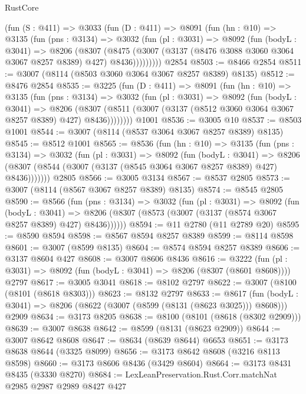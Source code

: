 \begin{lexlean}{RustCore}
\begin{coremodule}
    (fun (S : @411) =>
    @3033
      (fun (D : @411) =>
      @8091
        (fun (hn : @10) =>
        @3135
          (fun (pns : @3134) =>
          @3032
            (fun (pl : @3031) =>
            @8092
              (fun (bodyL : @3041) =>
              @8206
                (@8307
                  (@8475
                    (@3007 (@3137 (@8476 @3088 @3060 @3064 @3067 @8257 @8389) @427) @8436)))))))))
    @2854
@8503 := @8466 @2854
@8511 := @3007 (@8114 (@8503 @3060 @3064 @3067 @8257 @8389) @8135)
@8512 := @8476 @2854
@8535 := @3225
    (fun (D : @411) =>
    @8091
      (fun (hn : @10) =>
      @3135
        (fun (pns : @3134) =>
        @3032
          (fun (pl : @3031) =>
          @8092
            (fun (bodyL : @3041) =>
            @8206
              (@8307 (@8511 (@3007 (@3137 (@8512 @3060 @3064 @3067 @8257 @8389) @427) @8436))))))))
    @1001
@8536 := @3005 @10
@8537 := @8503 @1001
@8544 := @3007 (@8114 (@8537 @3064 @3067 @8257 @8389) @8135)
@8545 := @8512 @1001
@8565 := @8536
    (fun (hn : @10) =>
    @3135
      (fun (pns : @3134) =>
      @3032
        (fun (pl : @3031) =>
        @8092
          (fun (bodyL : @3041) =>
          @8206 (@8307 (@8544 (@3007 (@3137 (@8545 @3064 @3067 @8257 @8389) @427) @8436)))))))
    @2805
@8566 := @3005 @3134
@8567 := @8537 @2805
@8573 := @3007 (@8114 (@8567 @3067 @8257 @8389) @8135)
@8574 := @8545 @2805
@8590 := @8566
    (fun (pns : @3134) =>
    @3032
      (fun (pl : @3031) =>
      @8092
        (fun (bodyL : @3041) =>
        @8206 (@8307 (@8573 (@3007 (@3137 (@8574 @3067 @8257 @8389) @427) @8436))))))
@8594 := @11 @2780 (@11 @2789 @20)
@8595 := @8590 @8594
@8598 := @8567 @8594 @8257 @8389
@8599 := @8114 @8598
@8601 := @3007 (@8599 @8135)
@8604 := @8574 @8594 @8257 @8389
@8606 := @3137 @8604 @427
@8608 := @3007 @8606 @8436
@8616 := @3222
    (fun (pl : @3031) => @8092 (fun (bodyL : @3041) => @8206 (@8307 (@8601 @8608))))
    @2797
@8617 := @3005 @3041
@8618 := @8102 @2797
@8622 := @3007 (@8100 (@8101 (@8618 @8303)))
@8623 := @8132 @2797
@8633 := @8617
    (fun (bodyL : @3041) => @8206 (@8622 (@3007 (@8599 (@8131 (@8623 @3025))) @8608)))
    @2909
@8634 := @3173 @8205
@8638 := @8100 (@8101 (@8618 (@8302 @2909)))
@8639 := @3007 @8638
@8642 := @8599 (@8131 (@8623 @2909))
@8644 := @3007 @8642 @8608
@8647 := @8634 (@8639 @8644) @6653
@8651 := @3173 @8638 @8644 (@3325 @8099)
@8656 := @3173 @8642 @8608 (@3216 @8113 @8598)
@8660 := @3173 @8606 @8436 (@3429 @8604)
@8664 := @3173 @8431 @8435 (@3330 @8270)
@8684 := LexLeanPreservation.Rust.Corr.matchNat
    @2985
    @2987
    @2989
    @8427
    @427

\end{coremodule}
\end{lexlean}
